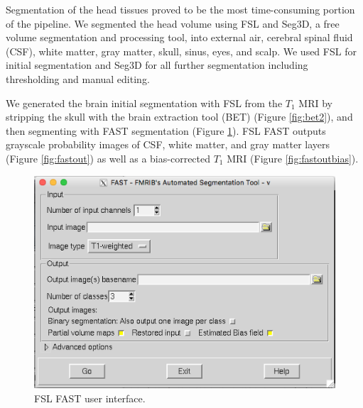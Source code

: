 
Segmentation of the head tissues proved to be the most time-consuming portion of the pipeline. We segmented the head volume using FSL and Seg3D, a free volume segmentation and processing tool, \cite{ref:seg3d} into external air, cerebral spinal fluid (CSF), white matter, gray matter, skull, sinus, eyes, and scalp. We used FSL for initial segmentation and Seg3D for all further segmentation including thresholding and manual editing.

We generated the brain initial segmentation with FSL from the $T_1$ MRI by stripping the skull with the brain extraction tool (BET) \cite{ref:bet1} (Figure \ref{fig:bet2}), and then segmenting with FAST segmentation (Figure \ref{fig:fslfast}). FSL FAST outputs grayscale probability images of CSF, white matter, and gray matter layers (Figure \ref{fig:fastout}) as well as a bias-corrected $T_1$ MRI (Figure \ref{fig:fastoutbias}). 

\begin{figure}[H]
    \centering
    \includegraphics[width=.8\textwidth]{Figures/FSL_FAST}
    \caption{FSL FAST user interface.}
    \label{fig:fslfast}
\end{figure}

